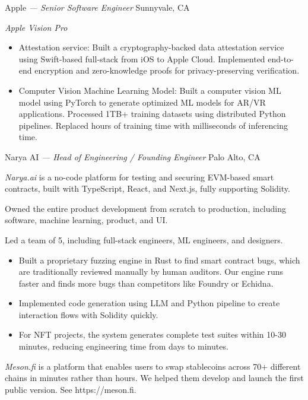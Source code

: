 \documentclass[]{friggeri-cv}
\begin{document}
\begin{entrylist}
  {Apple \emph{--- Senior Software Engineer}}
  {Sunnyvale, CA}
  {
    \emph{Apple Vision Pro}
    \begin{itemize}
      \item Attestation service:
      Built a cryptography-backed data attestation service using Swift-based full-stack from iOS to Apple Cloud.
      Implemented end-to-end encryption and zero-knowledge proofs for privacy-preserving verification.
      \item Computer Vision Machine Learning Model:
      Built a computer vision ML model using PyTorch to generate optimized ML models for AR/VR applications.
      Processed 1TB+ training datasets using distributed Python pipelines.
      Replaced hours of training time with milliseconds of inferencing time.
    \end{itemize}
  }
  {Narya AI \emph{--- Head of Engineering / Founding Engineer}}
  {Palo Alto, CA}
  {
    \emph{Narya.ai} is a no-code platform for testing and securing EVM-based smart contracts,
    built with TypeScript, React, and Next.js, fully supporting Solidity.

    Owned the entire product development from scratch to production, including software, machine learning, product, and UI.

    Led a team of 5, including full-stack engineers, ML engineers, and designers.

    \begin{itemize}
      \item Built a proprietary fuzzing engine in Rust to find smart contract bugs,
      which are traditionally reviewed manually by human auditors.
      Our engine runs faster and finds more bugs than competitors like Foundry or Echidna.
      \item Implemented code generation using LLM and Python pipeline to create interaction flows with Solidity quickly.
      \item For NFT projects, the system generates complete test suites within 10-30 minutes,
      reducing engineering time from days to minutes.
    \end{itemize}

    \emph{Meson.fi} is a platform that enables users to swap stablecoins across 70+ different chains in minutes rather than hours.
    We helped them develop and launch the first public version.
    See https://meson.fi.

}
\end{entrylist}
\end{document}
